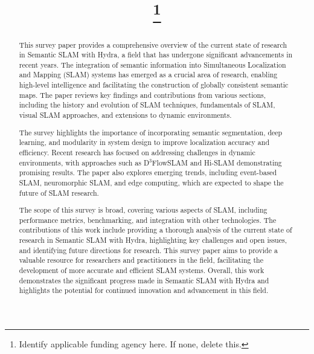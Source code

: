 \documentclass[conference]{IEEEtran}
\begin{document}
\title{
\thanks{Identify applicable funding agency here. If none, delete this.}
}

\author{
\and
{}
}

\maketitle

\begin{abstract}
This survey paper provides a comprehensive overview of the current state of research in Semantic SLAM with Hydra, a field that has undergone significant advancements in recent years. The integration of semantic information into Simultaneous Localization and Mapping (SLAM) systems has emerged as a crucial area of research, enabling high-level intelligence and facilitating the construction of globally consistent semantic maps. The paper reviews key findings and contributions from various sections, including the history and evolution of SLAM techniques, fundamentals of SLAM, visual SLAM approaches, and extensions to dynamic environments.

The survey highlights the importance of incorporating semantic segmentation, deep learning, and modularity in system design to improve localization accuracy and efficiency. Recent research has focused on addressing challenges in dynamic environments, with approaches such as D$^3$FlowSLAM and Hi-SLAM demonstrating promising results. The paper also explores emerging trends, including event-based SLAM, neuromorphic SLAM, and edge computing, which are expected to shape the future of SLAM research.

The scope of this survey is broad, covering various aspects of SLAM, including performance metrics, benchmarking, and integration with other technologies. The contributions of this work include providing a thorough analysis of the current state of research in Semantic SLAM with Hydra, highlighting key challenges and open issues, and identifying future directions for research. This survey paper aims to provide a valuable resource for researchers and practitioners in the field, facilitating the development of more accurate and efficient SLAM systems. Overall, this work demonstrates the significant progress made in Semantic SLAM with Hydra and highlights the potential for continued innovation and advancement in this field.
\end{abstract}
\end{document}
